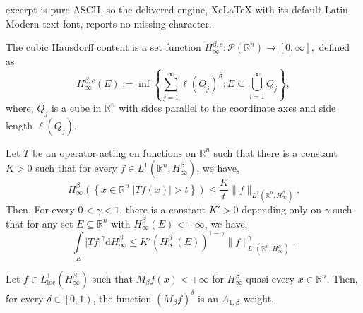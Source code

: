 \documentclass[10pt,a4paper]{amsart}
\begin{document}
excerpt is pure ASCII, so the delivered engine, XeLaTeX with its default Latin Modern text font, reports no missing character.
		\begin{definition}
			\label{CubicHC}
			The cubic Hausdorff content is a set function $H_\infty^{\beta,c}: \mathcal{P}(\mathbb{R}^n) \rightarrow [0,\infty],$ defined as
			\begin{equation}
				H_\infty^{\beta,c} (E) := \inf\left \{\sum_{j=1}^{\infty}\ell (Q_j)^\beta : E \subseteq \bigcup_{i=1}^\infty Q_j \right\},
			\end{equation}
			where, $Q_j$ is a cube in $\mathbb{R}^n$ with sides parallel to the coordinate axes and side length $ \ell(Q_j)$. 
		\end{definition}

		\begin{lemma}
			\label{PreparatoryLemmaConstructionA1}
			Let $T$ be an operator acting on functions on $\mathbb{R}^n$ such that there is a constant $K > 0$ such that for every $f \in L^1 \left( \mathbb{R}^n, H_{\infty}^{\beta} \right)$, we have,
			\begin{equation}
				\label{Weak11T}
				H_{\infty}^{\beta} \left( \left\lbrace x \in \mathbb{R}^n | \left| Tf \left( x \right) \right| > t \right\rbrace \right) \leq \frac{K}{t} \| f \|_{L^1 \left( \mathbb{R}^n, H^{\beta}_{\infty} \right)}.
			\end{equation}
			Then, For every $0 < \gamma < 1$, there is a constant $K' > 0$ depending only on $\gamma$ such that for any set $E \subseteq \mathbb{R}^n$ with $H^{\beta}_{\infty} \left( E \right) < + \infty$, we have,
			\begin{equation}
				\label{PreparatoryEquation}
				\int\limits_{E} \left| Tf \right|^{\gamma} \mathrm{d}H^{\beta}_{\infty} \leq K' \left( H^{\beta}_{\infty} \left( E \right) \right)^{1 - \gamma} \| f \|_{L^1 \left( \mathbb{R}^n, H^{\beta}_{\infty} \right)}^{\gamma}.
			\end{equation}
		\end{lemma}

		\begin{theorem}
			\label{ConstructionA1Weights}
			Let $f \in L^1_{\text{loc}} \left( H^{\beta}_{\infty} \right)$ such that $M_{\beta}f \left( x \right) < + \infty$ for $H^{\beta}_{\infty}$-quasi-every $x \in \mathbb{R}^n$. Then, for every $\delta \in \left[ 0, 1 \right)$, the function $\left( M_{\beta}f \right)^{\delta}$ is an $A_{1, \beta}$ weight.
		\end{theorem}
\end{document}
